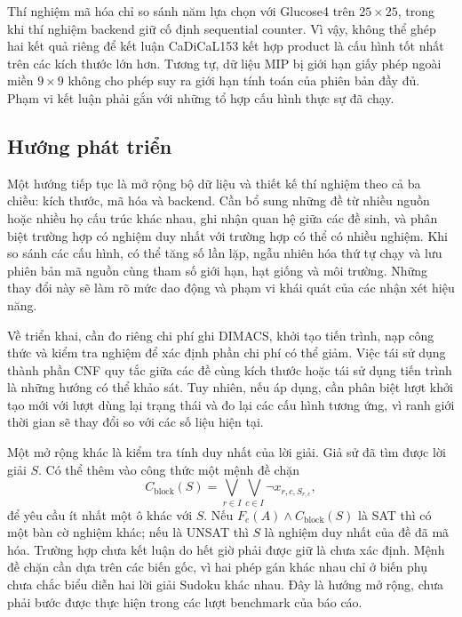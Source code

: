\documentclass[a4paper,fleqn]{cas-sc}
\begin{document}
Thí nghiệm mã hóa chỉ so sánh năm lựa chọn với Glucose4 trên
$25\times25$, trong khi thí nghiệm backend giữ cố định sequential
counter. Vì vậy, không thể ghép hai kết quả riêng để kết luận
CaDiCaL153 kết hợp product là cấu hình tốt nhất trên các kích thước
lớn hơn. Tương tự, dữ liệu MIP bị giới hạn giấy phép ngoài miền
$9\times9$ không cho phép suy ra giới hạn tính toán của phiên bản đầy
đủ. Phạm vi kết luận phải gắn với những tổ hợp cấu hình thực sự đã chạy.

\subsection{Hướng phát triển}

Một hướng tiếp tục là mở rộng bộ dữ liệu và thiết kế thí nghiệm theo
cả ba chiều: kích thước, mã hóa và backend. Cần bổ sung những đề từ
nhiều nguồn hoặc nhiều họ cấu trúc khác nhau, ghi nhận quan hệ giữa
các đề sinh, và phân biệt trường hợp có nghiệm duy nhất với trường hợp
có thể có nhiều nghiệm. Khi so sánh các cấu hình, có thể tăng số lần
lặp, ngẫu nhiên hóa thứ tự chạy và lưu phiên bản mã nguồn cùng tham số
giới hạn, hạt giống và môi trường. Những thay đổi này sẽ làm rõ mức
dao động và phạm vi khái quát của các nhận xét hiệu năng.

Về triển khai, cần đo riêng chi phí ghi DIMACS, khởi tạo tiến trình,
nạp công thức và kiểm tra nghiệm để xác định phần chi phí có thể giảm.
Việc tái sử dụng thành phần CNF quy tắc giữa các đề cùng kích thước
hoặc tái sử dụng tiến trình là những hướng có thể khảo sát. Tuy nhiên,
nếu áp dụng, cần phân biệt lượt khởi tạo mới với lượt dùng lại trạng
thái và đo lại các cấu hình tương ứng, vì ranh giới thời gian sẽ thay
đổi so với các số liệu hiện tại.

Một mở rộng khác là kiểm tra tính duy nhất của lời giải. Giả sử đã
tìm được lời giải $S$. Có thể thêm vào công thức một mệnh đề chặn
\begin{equation}
 C_{\mathrm{block}}(S)=
 \bigvee_{r\in I}\bigvee_{c\in I}\neg x_{r,c,S_{r,c}},
 \label{eq:conclusion-uniqueness}
\end{equation}
để yêu cầu ít nhất một ô khác với $S$. Nếu
$F_e(A)\land C_{\mathrm{block}}(S)$ là SAT thì có một bàn cờ nghiệm
khác; nếu là UNSAT thì $S$ là nghiệm duy nhất của đề đã mã hóa.
Trường hợp chưa kết luận do hết giờ phải được giữ là chưa xác định.
Mệnh đề chặn cần dựa trên các biến gốc, vì hai phép gán khác nhau chỉ
ở biến phụ chưa chắc biểu diễn hai lời giải Sudoku khác nhau. Đây là
hướng mở rộng, chưa phải bước được thực hiện trong các lượt benchmark
của báo cáo.
\end{document}
